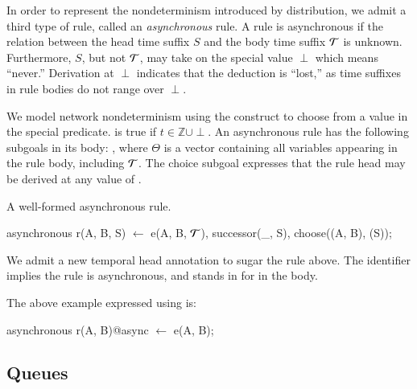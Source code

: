 In order to represent the nondeterminism introduced by distribution, we admit a
third type of rule, called an {\em asynchronous} rule.  A rule is asynchronous
if the 
relation between the head time suffix $S$ and the body time suffix $\Tau$ is
unknown.  Furthermore, $S$, but not $\Tau$, may take on the special value
$\perp$ which means ``never.''  Derivation at $\perp$ indicates that the
deduction is ``lost,'' as time suffixes in rule bodies do not range over
$\perp$.

We model network nondeterminism using the  construct to choose
from a value in the special  predicate.   is
true if $t \in \mathbb{Z} \cup \perp$. An asynchronous rule has the following
subgoals in its body: , where
$\Theta$ is a vector containing all variables appearing in the rule body,
including $\Tau$.  The choice subgoal expresses that the rule head may be
derived at any value of .

\begin{example}
A well-formed asynchronous \lang rule.

\begin{Dedalus}
asynchronous
r(A, B, S) \(\leftarrow\)
   e(A, B, \(\Tau\)), successor(_, S), choose((A, B), (S));
\end{Dedalus}
\end{example}

We admit a new temporal head annotation to sugar the rule above.  The
identifier  implies the rule is asynchronous, and stands in for
 in the body.  

The above example expressed using  is:

\begin{Dedalus}
asynchronous
r(A, B)@async \(\leftarrow\) 
  e(A, B);
\end{Dedalus}

\subsection{Queues}

